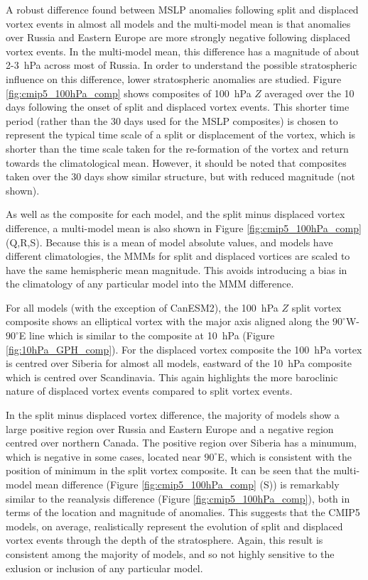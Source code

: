 A robust difference found between MSLP anomalies following split and displaced
vortex events in almost all models and the multi-model mean is that anomalies
over Russia and Eastern Europe are more strongly negative following displaced
vortex events. In the multi-model mean, this difference has a magnitude of about
2-3~hPa across most of Russia. In order to understand the possible stratospheric
influence on this difference, lower stratospheric anomalies are studied. Figure
\ref{fig:cmip5_100hPa_comp} shows composites of 100~hPa $Z$ averaged over the 10
days following the onset of split and displaced vortex events. This shorter time
period (rather than the 30 days used for the MSLP composites) is chosen to
represent the typical time scale of a split or displacement of the vortex, which
is shorter than the time scale taken for the re-formation of the vortex and
return towards the climatological mean. However, it should be noted that
composites taken over the 30 days show similar structure, but with reduced
magnitude (not shown). 

As well as the composite for each model, and the split minus displaced vortex
difference, a multi-model mean is also shown in Figure
\ref{fig:cmip5_100hPa_comp} (Q,R,S). Because this is a mean of model absolute
values, and models have different climatologies, the MMMs for split and
displaced vortices are scaled to have the same hemispheric mean magnitude. This
avoids introducing a bias in the climatology of any particular model into the
MMM difference. 

For all models (with the exception of CanESM2), the 100~hPa $Z$ split vortex
composite shows an elliptical vortex with the major axis aligned along the
$90^{\circ}$W-$90^{\circ}$E line which is similar to the composite at 10~hPa
(Figure \ref{fig:10hPa_GPH_comp}). For the displaced vortex composite the
100~hPa vortex is centred over Siberia for almost all models, eastward of the
10~hPa composite which is centred over Scandinavia. This again highlights the
more baroclinic nature of displaced vortex events compared to split vortex
events.

In the split minus displaced vortex difference, the majority of models show a
large positive region over Russia and Eastern Europe and a negative region
centred over northern Canada. The positive region over Siberia has a minumum,
which is negative in some cases, located near $90^{\circ}$E, which is consistent
with the position of minimum in the split vortex composite. It can be seen that
the multi-model mean difference (Figure \ref{fig:cmip5_100hPa_comp} (S)) is
remarkably similar to the reanalysis difference (Figure
\ref{fig:cmip5_100hPa_comp}), both in terms of the location and magnitude of
anomalies. This suggests that the CMIP5 models, on average, realistically
represent the evolution of split and displaced vortex events through the depth
of the stratosphere. Again, this result is consistent among the majority of
models, and so not highly sensitive to the exlusion or inclusion of any
particular model. 

